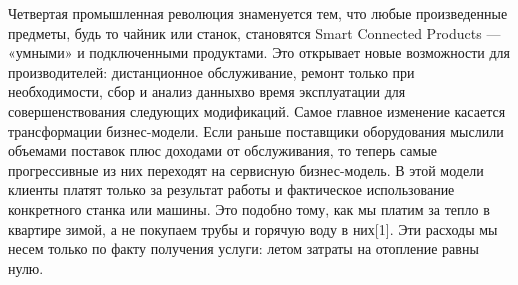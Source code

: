 \label{sec:intro}

Четвертая промышленная революция знаменуется тем, что любые произведенные предметы, будь то чайник или станок, становятся Smart Connected Products — «умными» и подключенными продуктами.
Это открывает новые возможности для производителей: дистанционное обслуживание, ремонт только при необходимости, сбор и анализ данныхво время эксплуатации для совершенствования следующих модификаций.
Самое главное изменение касается трансформации бизнес-модели. Если раньше поставщики оборудования мыслили объемами поставок плюс доходами от обслуживания, то теперь самые прогрессивные из них переходят на сервисную бизнес-модель.
В этой модели клиенты платят только за результат работы и фактическое использование конкретного станка или машины.
Это подобно тому, как мы платим за тепло в квартире зимой, а не покупаем трубы и горячую воду в них[1].
Эти расходы мы несем только по факту получения услуги: летом затраты на отопление равны нулю.
